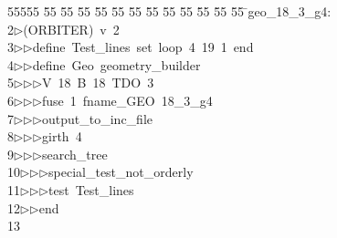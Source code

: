%
%
\begin{tabbing}
55555 \= 55 \= 55 \= 55 \= 55 \= 55 \= 55 \= 55 \= 55 \= 55 \= 55 \= 55 \= 55 \= \>geo\_18\_3\_g4:\\[0pt]
2\>$\triangleright$\>(ORBITER)\ v\ 2\ \\[0pt]
3\>$\triangleright$\>$\triangleright$\>define\ Test\_lines\ set\ loop\ 4\ 19\ 1\ end\ \\[0pt]
4\>$\triangleright$\>$\triangleright$\>define\ Geo\ geometry\_builder\ \\[0pt]
5\>$\triangleright$\>$\triangleright$\>$\triangleright$\>V\ 18\ B\ 18\ TDO\ 3\ \\[0pt]
6\>$\triangleright$\>$\triangleright$\>$\triangleright$\>fuse\ 1\ fname\_GEO\ 18\_3\_g4\ \\[0pt]
7\>$\triangleright$\>$\triangleright$\>$\triangleright$\>output\_to\_inc\_file\ \\[0pt]
8\>$\triangleright$\>$\triangleright$\>$\triangleright$\>girth\ 4\ \\[0pt]
9\>$\triangleright$\>$\triangleright$\>$\triangleright$\>search\_tree\ \\[0pt]
10\>$\triangleright$\>$\triangleright$\>$\triangleright$\>special\_test\_not\_orderly\ \\[0pt]
11\>$\triangleright$\>$\triangleright$\>$\triangleright$\>test\ Test\_lines\ \\[0pt]
12\>$\triangleright$\>$\triangleright$\>end\\[0pt]
13\>\end{tabbing}
